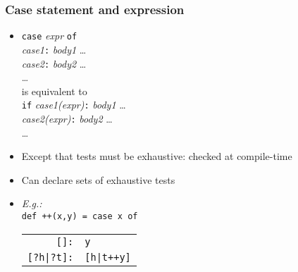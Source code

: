 \documentclass[12pt]{beamer}
\begin{document}
\begin{frame}[fragile]
\frametitle{Case statement and expression}
\begin{itemize}
\item \texttt{case} \emph{expr} \texttt{of} \\
\hspace*{1em} \emph{case1}\texttt{:} \emph{body1} \ldots \\
\hspace*{1em} \emph{case2}\texttt{:} \emph{body2} \ldots \\
\hspace*{1em} \ldots \\[2ex]
is equivalent to \\[2ex]
 \texttt{if} \emph{case1(expr)}\texttt{:} \emph{body1} \ldots \\
\hspace*{1em} \emph{case2(expr)}\texttt{:} \emph{body2} \ldots \\
\hspace*{1em} \ldots
\item Except that tests must be exhaustive: checked at compile-time
\item Can declare sets of exhaustive tests
\item \emph{E.g.:}\\
  \texttt{def ++(x,y) = case x of} \\
\hspace*{3em}
\begin{tabular}{rl}
\texttt{[]:} & \texttt{y}\\
\texttt{[?h|?t]:} & \texttt{[h|t++y]}\\
\end{tabular}
\end{itemize}
\end{frame}
\end{document}
